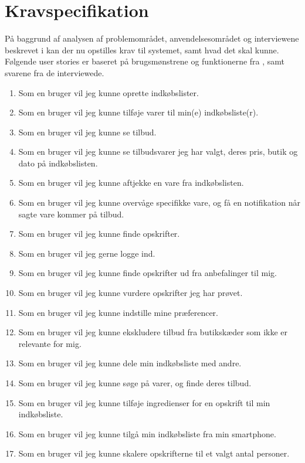 \section{Kravspecifikation}

På baggrund af analysen af problemområdet, anvendelsesområdet og interviewene beskrevet i   kan der nu opstilles krav til systemet, samt hvad det skal kunne.
Følgende user stories er baseret på brugsmønstrene og funktionerne fra , samt svarene fra de interviewede.

\begin{enumerate}
	\item Som en bruger vil jeg kunne oprette indkøbslister.
	\item Som en bruger vil jeg kunne tilføje varer til min(e) indkøbsliste(r).
	\item Som en bruger vil jeg kunne se tilbud.
	\item Som en bruger vil jeg kunne se tilbudsvarer jeg har valgt, deres pris, butik og dato på indkøbslisten.
	\item Som en bruger vil jeg kunne aftjekke en vare fra indkøbslisten.
	\item Som en bruger vil jeg kunne overvåge specifikke vare, og få en notifikation når sagte vare kommer på tilbud.
	\item Som en bruger vil jeg kunne finde opskrifter.
	\item Som en bruger vil jeg gerne logge ind.
	\item Som en bruger vil jeg kunne finde opskrifter ud fra anbefalinger til mig.
	\item Som en bruger vil jeg kunne vurdere opskrifter jeg har prøvet.
	\item Som en bruger vil jeg kunne indstille mine præferencer.
	\item Som en bruger vil jeg kunne ekskludere tilbud fra butikskæder som ikke er relevante for mig.
	\item Som en bruger vil jeg kunne dele min indkøbsliste med andre.
	\item Som en bruger vil jeg kunne søge på varer, og finde deres tilbud.
	\item Som en bruger vil jeg kunne tilføje ingredienser for en opskrift til min indkøbsliste.
	\item Som en bruger vil jeg kunne tilgå min indkøbsliste fra min smartphone.
	\item Som en bruger vil jeg kunne skalere opskrifterne til et valgt antal personer.
\end{enumerate}

